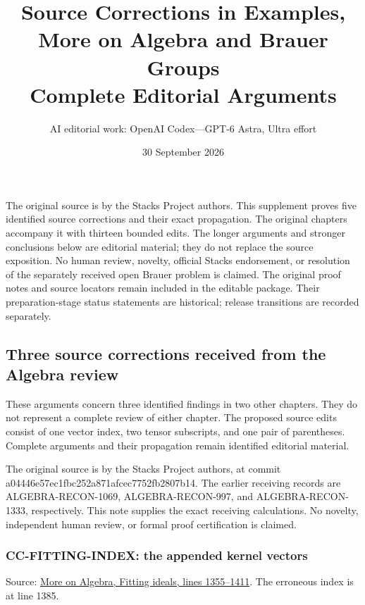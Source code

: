 \documentclass[11pt]{article}
\title{Source Corrections in Examples, More on Algebra and Brauer Groups\\Complete Editorial Arguments}
\author{AI editorial work: OpenAI Codex---GPT-6 Astra, Ultra effort}
\date{30 September 2026}
\begin{document}
\maketitle
\noindent
The original source is by the Stacks Project authors. This supplement
proves five identified source corrections and their exact propagation.
The original chapters accompany it with thirteen bounded edits. The
longer arguments and stronger conclusions below are editorial material;
they do not replace the source exposition. No human review, novelty,
official Stacks endorsement, or resolution of the separately received
open Brauer problem is claimed. The original proof notes and source
locators remain included in the editable package. Their preparation-stage
status statements are historical; release transitions are recorded separately.
\tableofcontents
\subsection{Three source corrections received from the Algebra review}\label{three-source-corrections-received-from-the-algebra-review}

These arguments concern three identified findings in two other chapters. They do not represent a complete review of either chapter. The proposed source edits consist of one vector index, two tensor subscripts, and one pair of parentheses. Complete arguments and their propagation remain identified editorial material.

The original source is by the Stacks Project authors, at commit a04446e57ec1fbc252a871afcec7752fb2807b14. The earlier receiving records are ALGEBRA-RECON-1069, ALGEBRA-RECON-997, and ALGEBRA-RECON-1333, respectively. This note supplies the exact receiving calculations. No novelty, independent human review, or formal proof certification is claimed.

\subsubsection{CC-FITTING-INDEX: the appended kernel vectors}\label{cc-fitting-index-the-appended-kernel-vectors}

Source: \href{https://github.com/stacks/stacks-project/blob/a04446e57ec1fbc252a871afcec7752fb2807b14/more-algebra.tex\#L1355}{More on Algebra, Fitting ideals, lines 1355--1411}. The erroneous index is at line 1385.
\end{document}

